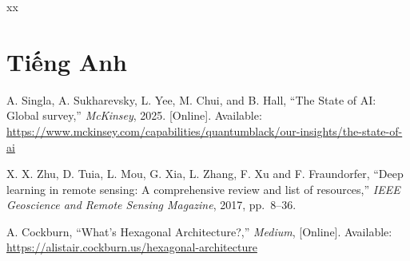 \documentclass[a4paper,12pt,oneside]{book}%
\begin{document}
\begin{thebibliography}{xx}

\section*{Tiếng Anh}

A. Singla, A. Sukharevsky, L. Yee, M. Chui, and B. Hall, ``The State of AI: Global survey,'' {\em McKinsey}, 2025. [Online]. Available: \url{https://www.mckinsey.com/capabilities/quantumblack/our-insights/the-state-of-ai}

X. X. Zhu, D. Tuia, L. Mou, G. Xia, L. Zhang, F. Xu and F. Fraundorfer, ``Deep learning in remote sensing: A comprehensive review and list of resources,'' {\em IEEE Geoscience and Remote Sensing Magazine}, 2017, pp.~8--36.

A. Cockburn, ``What's Hexagonal Architecture?,'' {\em Medium}, [Online]. Available: \url{https://alistair.cockburn.us/hexagonal-architecture}

\end{thebibliography}
\end{document}
